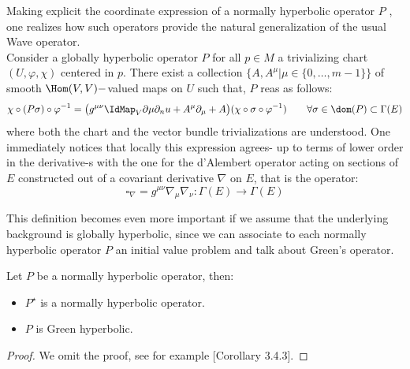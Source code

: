 \documentclass[Main]{subfiles}
\begin{document}
		\begin{observation}%
			Making explicit the coordinate expression of a normally hyperbolic operator $P$ , one realizes how such operators  provide the natural generalization of the usual Wave operator. 
			\\
			Consider a globally hyperbolic operator $P$ for all $p \in M$ a trivializing chart $(U, \varphi, \chi)$ centered in $p$. 
			There exist a collection $\big\{A, A^\mu \vert \mu\in \{0, \ldots ,m-1\}\big\}$ of smooth 
			$\Hom(V,V)-$valued maps on $U$ such that, $P$ reas as follows:
			\begin{displaymath}
				\chi \circ ( P \sigma) \circ \varphi^{-1} =
				\big( g^{\mu \nu} \IdMap_V \partial\mu \partial_nu + A^\mu \partial_\mu + A\big)
				(\chi \circ \sigma \circ \varphi^{-1} ) 
				\qquad \forall \sigma \in \dom(P) \subset \Gamma(E)
			\end{displaymath}
		where both the chart and the vector bundle trivializations are understood. 
		One immediately notices that locally this expression agrees- up to terms of lower order in the derivative-s with the one for the d'Alembert operator acting on sections of $E$  constructed out of a covariant derivative $\nabla$ on $E$, that is the operator:
		\begin{displaymath}
			\square_\nabla = g^{\mu \nu} \nabla_\mu \nabla_\nu : \Gamma(E) \rightarrow \Gamma(E)
		\end{displaymath}
		\end{observation}
		This definition becomes even more important if we assume that the underlying background is globally hyperbolic, since we can associate to each normally hyperbolic operator $P$ an initial value problem and talk about Green's operator.
		\begin{proposition}
			Let $P$ be a normally hyperbolic operator, then:
			\begin{itemize}
				\item	$P^\star$ is a normally hyperbolic operator.
				\item $P$ is Green hyperbolic.
			\end{itemize}
		\end{proposition}	
		\begin{proof}
			We omit the proof, see for example \cite{barwav}[Corollary 3.4.3].
		\end{proof}
		
\end{document}
